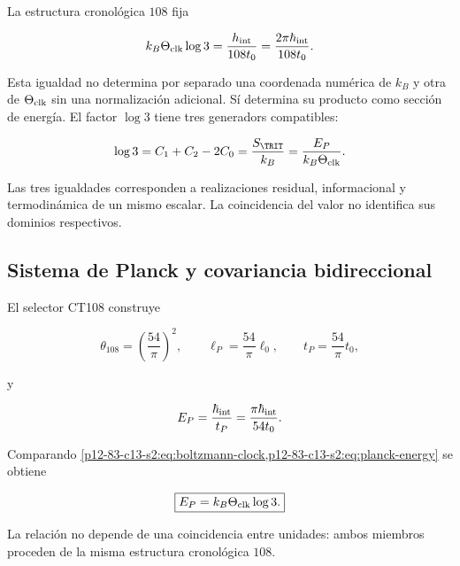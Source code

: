 La estructura cronol\'ogica \(108\) fija

\begin{equation}
k_B\Theta_{\rm clk}\log3
=\frac{h_{\rm int}}{108t_0}
=\frac{2\pi\hbar_{\rm int}}{108t_0}.
\label{p12-83-c13-s2:eq:boltzmann-clock}
\end{equation}

Esta igualdad no determina por separado una coordenada num\'erica de \(k_B\) y otra de \(\Theta_{\rm clk}\) sin una normalizaci\'on adicional. S\'i determina su producto como secci\'on de energ\'ia. El factor \(\log3\) tiene tres generadors compatibles:

\begin{equation}
\log3=C_1+C_2-2C_0
=\frac{S_{\TRIT}}{k_B}
=\frac{E_P}{k_B\Theta_{\rm clk}}.
\label{p12-83-c13-s2:eq:log3-triple}
\end{equation}

Las tres igualdades corresponden a realizaciones residual, informacional y
termodin\'amica de un mismo escalar. La coincidencia del valor no identifica
sus dominios respectivos.

\subsection{Sistema de Planck y covariancia bidireccional}

El selector CT108 construye

\begin{equation}
\theta_{108}=\left(\frac{54}{\pi}\right)^2,
\qquad
\ell_P=\frac{54}{\pi}\ell_0,
\qquad
t_P=\frac{54}{\pi}t_0,
\label{p12-83-c13-s2:eq:planck-length-time}
\end{equation}

y

\begin{equation}
E_P=\frac{\hbar_{\rm int}}{t_P}
=\frac{\pi\hbar_{\rm int}}{54t_0}.
\label{p12-83-c13-s2:eq:planck-energy}
\end{equation}

Comparando \cref{p12-83-c13-s2:eq:boltzmann-clock,p12-83-c13-s2:eq:planck-energy} se obtiene

\begin{equation}
\boxed{E_P=k_B\Theta_{\rm clk}\log3.}
\label{p12-83-c13-s2:eq:planck-trit}
\end{equation}

La relaci\'on no depende de una coincidencia entre unidades: ambos miembros
proceden de la misma estructura cronol\'ogica \(108\).

